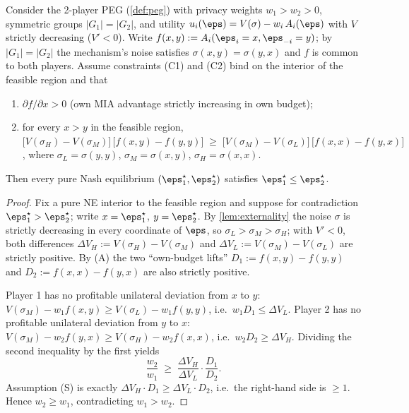 \begin{proposition}
\label{prop:self-sorting}
Consider the 2-player PEG (\cref{def:peg}) with privacy weights
$w_1 > w_2 > 0$, symmetric groups $|G_1| = |G_2|$, and utility
$u_i(\boldsymbol{\eps}) = V(\sigma) - w_i\, A_i(\boldsymbol{\eps})$
with $V$ strictly decreasing ($V' < 0$). Write $f(x, y) := A_i(\eps_i = x,
\eps_{-i} = y)$; by $|G_1| = |G_2|$ the mechanism's noise satisfies
$\sigma(x,y) = \sigma(y,x)$ and $f$ is common to both players.
Assume constraints \textup{(C1)} and \textup{(C2)} bind on the interior
of the feasible region and that
\begin{enumerate}
  \item[\textup{(A)}] $\partial f / \partial x > 0$ (own MIA advantage
        strictly increasing in own budget);
  \item[\textup{(S)}] for every $x > y$ in the feasible region,
        $\bigl[V(\sigma_H) - V(\sigma_M)\bigr]\,
         \bigl[f(x, y) - f(y, y)\bigr]
         \;\ge\;
         \bigl[V(\sigma_M) - V(\sigma_L)\bigr]\,
         \bigl[f(x, x) - f(y, x)\bigr]$,
        where $\sigma_L = \sigma(y,y)$, $\sigma_M = \sigma(x,y)$,
        $\sigma_H = \sigma(x,x)$.
\end{enumerate}
Then every pure Nash equilibrium $(\eps_1^\star, \eps_2^\star)$ satisfies
$\eps_1^\star \le \eps_2^\star$.
\end{proposition}

\begin{proof}
Fix a pure NE interior to the feasible region and suppose for
contradiction $\eps_1^\star > \eps_2^\star$; write $x = \eps_1^\star$,
$y = \eps_2^\star$. By \cref{lem:externality} the noise $\sigma$ is
strictly decreasing in every coordinate of $\boldsymbol{\eps}$, so
$\sigma_L > \sigma_M > \sigma_H$; with $V' < 0$, both differences
$\Delta V_H := V(\sigma_H) - V(\sigma_M)$ and $\Delta V_L := V(\sigma_M)
- V(\sigma_L)$ are strictly positive. By (A) the two ``own-budget
lifts'' $D_1 := f(x,y) - f(y,y)$ and $D_2 := f(x,x) - f(y,x)$ are also
strictly positive.

Player 1 has no profitable unilateral deviation from $x$ to $y$:
$V(\sigma_M) - w_1 f(x,y) \ge V(\sigma_L) - w_1 f(y,y)$, i.e.\
$w_1 D_1 \le \Delta V_L$. Player 2 has no profitable unilateral
deviation from $y$ to $x$: $V(\sigma_M) - w_2 f(y,x) \ge V(\sigma_H) -
w_2 f(x,x)$, i.e.\ $w_2 D_2 \ge \Delta V_H$. Dividing the second
inequality by the first yields
\[
\frac{w_2}{w_1} \;\ge\; \frac{\Delta V_H}{\Delta V_L}\cdot\frac{D_1}{D_2}.
\]
Assumption (S) is exactly $\Delta V_H \cdot D_1 \ge \Delta V_L \cdot
D_2$, i.e.\ the right-hand side is $\ge 1$. Hence $w_2 \ge w_1$,
contradicting $w_1 > w_2$.
\end{proof}

